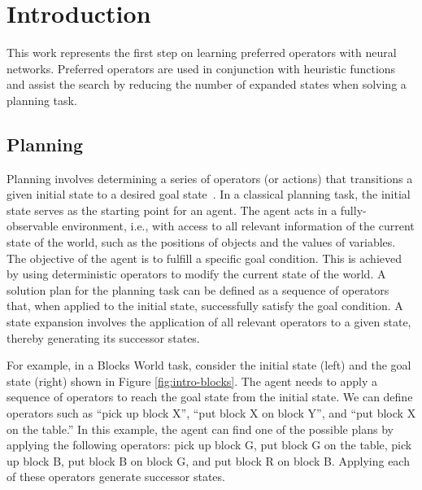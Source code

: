 \documentclass[ppgc,diss,english]{iiufrgs}
\begin{document}
\listoffigures

\listoftables

\listofalgorithms

\tableofcontents

%
%
\chapter{Introduction}
\label{cha:introduction}
This work represents the first step on learning preferred operators with neural networks. Preferred operators are used in conjunction with heuristic functions and assist the search by reducing the number of expanded states when solving a planning task.

\section{Planning}
\label{sec:intro-planning}
Planning involves determining a series of operators (or actions) that transitions a given initial state to a desired goal state~\cite{Lipovetsky/2014}.
In a classical planning task, the initial state serves as the starting point for an agent. The agent acts in a fully-observable environment, i.e., with access to all relevant information of the current state of the world, such as the positions of objects and the values of variables. The objective of the agent is to fulfill a specific goal condition. This is achieved by using deterministic operators to modify the current state of the world. A solution plan for the planning task can be defined as a sequence of operators that, when applied to the initial state, successfully satisfy the goal condition. A state expansion involves the application of all relevant operators to a given state, thereby generating its successor states.

For example, in a Blocks World task, consider the initial state (left) and the goal state (right) shown in Figure \ref{fig:intro-blocks}. The agent needs to apply a sequence of operators to reach the goal state from the initial state. We can define operators such as ``pick up block X'', ``put block X on block Y'', and ``put block X on the table.'' In this example, the agent can find one of the possible plans by applying the following operators: pick up block G, put block G on the table, pick up block B, put block B on block G, and put block R on block B. Applying each of these operators generate successor states.
\end{document}
